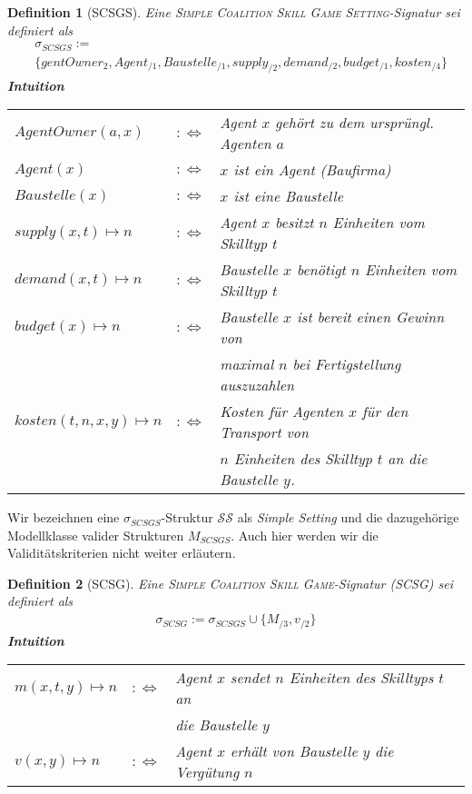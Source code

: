 \documentclass[12pt]{article}
\theoremstyle{break}
\newtheorem{definition}{Definition}
\begin{document}
\begin{definition}[SCSGS]
  Eine \textsc{Simple Coalition Skill Game Setting}-Signatur sei definiert als
  \begin{align*}
    &\sigma_{SCSGS}:= \\
    &\{gentOwner_{2}, Agent_{/1}, Baustelle_{/1}, supply_{/2}, demand_{/2}, budget_{/1}, kosten_{/4} \}
  \end{align*}
  \noindent
  \textbf{Intuition} \\
    \begin{tabular}{lrl}
    $AgentOwner(a, x)$&$:\Leftrightarrow$& Agent $x$ gehört zu dem ursprüngl. Agenten $a$ \\
    $Agent(x)$&$:\Leftrightarrow$& $x$ ist ein Agent (Baufirma) \\
    $Baustelle(x) $&$:\Leftrightarrow$& $x$ ist eine Baustelle \\
    $supply(x, t)\mapsto n $&$:\Leftrightarrow$& Agent $x$ besitzt $n$ Einheiten vom Skilltyp $t$ \\
    $demand(x, t)\mapsto n $&$:\Leftrightarrow$& Baustelle $x$ benötigt $n$ Einheiten vom Skilltyp $t$ \\
    $budget(x)\mapsto n $&$:\Leftrightarrow$&
    Baustelle $x$ ist bereit einen Gewinn von \\&&maximal $n$ bei Fertigstellung auszuzahlen\\
    $kosten(t, n, x, y)\mapsto n$&$:\Leftrightarrow$& Kosten für Agenten $x$ für den Transport von \\&&$n$ Einheiten des Skilltyp $t$ an die Baustelle $y$.
    \end{tabular}
\end{definition}

\noindent
Wir bezeichnen eine $\sigma_{SCSGS}$-Struktur $\mathcal{SS}$ als \textit{Simple Setting} und die dazugehörige Modellklasse valider Strukturen $M_{SCSGS}$. Auch hier werden wir die Validitätskriterien nicht weiter erläutern.

\begin{definition}[SCSG]
  Eine \textsc{Simple Coalition Skill Game}-Signatur (SCSG) sei definiert als
  \begin{align*}
    \sigma_{SCSG}:=\sigma_{SCSGS}\cup\{M_{/3}, v_{/2}\}
  \end{align*}
  \noindent
  \textbf{Intuition} \\
    \begin{tabular}{lrl}
    $m(x, t, y)\mapsto n$&$:\Leftrightarrow$& Agent $x$ sendet $n$ Einheiten des Skilltyps $t$ an \\&&die Baustelle $y$ \\
    $v(x,y)\mapsto n$&$:\Leftrightarrow$& Agent $x$ erhält von Baustelle $y$ die Vergütung $n$
    \end{tabular}
\end{definition}
\end{document}
